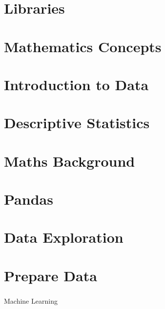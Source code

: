  \section[Libs]{Libraries}
 
 
 




 \section[Maths]{Mathematics Concepts}
 

 \section[DataIntro]{Introduction to Data}
 
 


 \section[Descr]{Descriptive Statistics}
 


 \section[Bak]{Maths Background}
 

 \section[Pandas]{Pandas}
 

 \section[EDA]{Data Exploration}
 

 \section[Prep]{Prepare Data}
 

 \begin{frame}[fragile]\frametitle{}
 \begin{center}
 {\Huge Machine Learning}
 \end{center}
 \end{frame}

